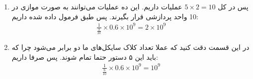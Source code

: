 \begin{enumerate}
    \item پس در کل $5 \times 2 = 10$ عملیات داریم. این ده عملیات می‌توانند به صورت موازی در 10 واحد پردازشی قرار بگیرند.
    پس طبق فرمول داده شده داریم:
    \begin{gather*}
        \frac{1}{\frac{3}{10}} \times 0.6 \times 10^9 = 2 \times 10^9
    \end{gather*}
    \item در این قسمت دقت کنید که عملا تعداد کلاک سایکل‌های ما دو برابر می‌شود چرا که باید این ۵ دستور حتما تمام شوند.
    پس صرفا داریم:
    \begin{gather*}
        \frac{1}{\frac{6}{10}} \times 0.6 \times 10^9 = 10^9
    \end{gather*}
\end{enumerate}
